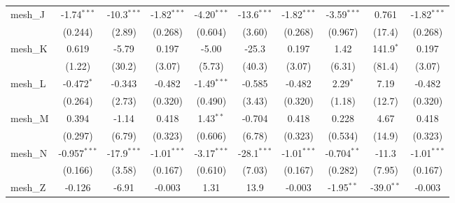 \begin{tabular}{lccccccccc}
   mesh\_J                                                     & -1.74$^{***}$  & -10.3$^{***}$  & -1.82$^{***}$ & -4.20$^{***}$ & -13.6$^{***}$  & -1.82$^{***}$ & -3.59$^{***}$ & 0.761         & -1.82$^{***}$\\   
                                                               & (0.244)        & (2.89)         & (0.268)       & (0.604)       & (3.60)         & (0.268)       & (0.967)       & (17.4)        & (0.268)\\   
   mesh\_K                                                     & 0.619          & -5.79          & 0.197         & -5.00         & -25.3          & 0.197         & 1.42          & 141.9$^{*}$   & 0.197\\   
                                                               & (1.22)         & (30.2)         & (3.07)        & (5.73)        & (40.3)         & (3.07)        & (6.31)        & (81.4)        & (3.07)\\   
   mesh\_L                                                     & -0.472$^{*}$   & -0.343         & -0.482        & -1.49$^{***}$ & -0.585         & -0.482        & 2.29$^{*}$    & 7.19          & -0.482\\   
                                                               & (0.264)        & (2.73)         & (0.320)       & (0.490)       & (3.43)         & (0.320)       & (1.18)        & (12.7)        & (0.320)\\   
   mesh\_M                                                     & 0.394          & -1.14          & 0.418         & 1.43$^{**}$   & -0.704         & 0.418         & 0.228         & 4.67          & 0.418\\   
                                                               & (0.297)        & (6.79)         & (0.323)       & (0.606)       & (6.78)         & (0.323)       & (0.534)       & (14.9)        & (0.323)\\   
   mesh\_N                                                     & -0.957$^{***}$ & -17.9$^{***}$  & -1.01$^{***}$ & -3.17$^{***}$ & -28.1$^{***}$  & -1.01$^{***}$ & -0.704$^{**}$ & -11.3         & -1.01$^{***}$\\   
                                                               & (0.166)        & (3.58)         & (0.167)       & (0.610)       & (7.03)         & (0.167)       & (0.282)       & (7.95)        & (0.167)\\   
   mesh\_Z                                                     & -0.126         & -6.91          & -0.003        & 1.31          & 13.9           & -0.003        & -1.95$^{**}$  & -39.0$^{**}$  & -0.003\\   

\end{tabular}
